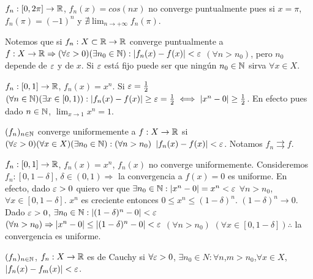 \begin{eg}
  $f_n: [0, 2\pi] \to \mathbb{R}$, $f_n(x) = cos(nx)$ no converge puntualmente pues si $x = \pi$, $f_n(\pi) = (-1)^n$ y $\nexists \lim_{n \to +\infty} f_n(\pi)$.
\end{eg}

Notemos que si $f_n: X \subset \mathbb{R} \to \mathbb{R}$ converge puntualmente a $f: X \to \mathbb{R} \Rightarrow (\forall \varepsilon > 0)(\exists n_0 \in \mathbb{N}) : |f_n(x) - f(x)| < \varepsilon$ $(\forall n > n_0)$, pero $n_0$ depende de $\varepsilon$ y de $x$. Si $\varepsilon$ está fijo puede ser que ningún $n_0 \in \mathbb{N}$ sirva $\forall x \in X$.

\begin{eg}
  $f_n: [0, 1] \to \mathbb{R}$, $f_n(x) = x^n$. Si $\varepsilon = \frac{1}{2}$ $(\forall n \in \mathbb{N})(\exists x \in [0, 1)) : |f_n(x) - f(x)| \geq \varepsilon = \frac{1}{2} \iff |x^n - 0| \geq \frac{1}{2}$. En efecto pues dado $n \in \mathbb{N}$, $\lim_{x \to 1} x^n = 1$.
\end{eg}

\begin{definition}
  $(f_n)_{n \in \mathbb{N}}$ converge uniformemente a $f: X \to \mathbb{R}$ si $(\forall \varepsilon > 0)(\forall x \in X)(\exists n_0 \in \mathbb{N}) : (\forall n > n_0)$ $ |f_n(x) - f(x)| < \varepsilon$. Notamos $f_n \rightrightarrows f$.
\end{definition}

\begin{eg}
  $f_n: [0, 1] \to \mathbb{R}$, $f_n(x) = x^n$, $f_n(x)$ no converge uniformemente. Consideremos $f_n: [0, 1 - \delta]$, $\delta \in (0, 1) \Rightarrow$ la convergencia a $f(x) = 0$ es uniforme. En efecto, dado $\varepsilon > 0$ quiero ver que $\exists n_0 \in \mathbb{N} : |x^n - 0| = x^n < \varepsilon$ $\forall n > n_0$, $\forall x \in [0, 1 - \delta]$. $x^n$ es creciente entonces $0 \leq x^n \leq (1-\delta)^n$. $(1-\delta)^n \to 0$. Dado $\varepsilon > 0$, $\exists n_0 \in \mathbb{N} : | (1-\delta)^n - 0 | < \varepsilon$ $(\forall n > n_0) \Rightarrow |x^n - 0| \leq |(1-\delta)^n - 0| < \varepsilon$ $(\forall n > n_0)$ $(\forall x \in [0, 1-\delta]) \therefore$ la convergencia es uniforme.
\end{eg}

\begin{definition}
  $(f_n)_{n \in \mathbb{N}}$, $f_n: X \to \mathbb{R}$ es de Cauchy si $\forall \varepsilon > 0$, $\exists n_0 \in N : \forall n$,$m > n_0$,$\forall x \in X$, $|f_n(x) - f_m(x)| < \varepsilon$.
\end{definition}


